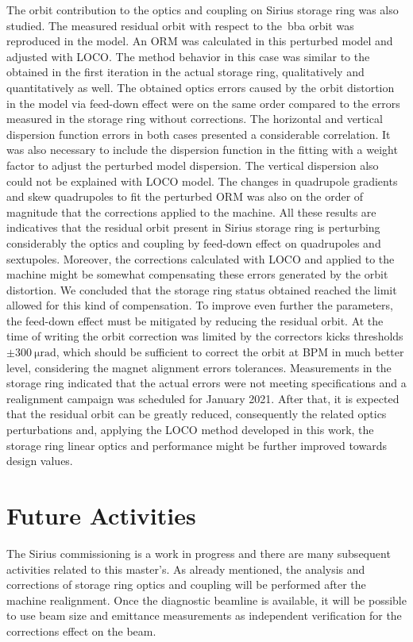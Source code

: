 The orbit contribution to the optics and coupling on Sirius storage ring was also studied. The measured residual orbit with respect to the~\gls{bba} orbit was reproduced in the model. An ORM was calculated in this perturbed model and adjusted with LOCO. The method behavior in this case was similar to the obtained in the first iteration in the actual storage ring, qualitatively and quantitatively as well. The obtained optics errors caused by the orbit distortion in the model via feed-down effect were on the same order compared to the errors measured in the storage ring without corrections. The horizontal and vertical dispersion function errors in both cases presented a considerable correlation. It was also necessary to include the dispersion function in the fitting with a weight factor to adjust the perturbed model dispersion. The vertical dispersion also could not be explained with LOCO model. The changes in quadrupole gradients and skew quadrupoles to fit the perturbed ORM was also on the order of magnitude that the corrections applied to the machine. All these results are indicatives that the residual orbit present in Sirius storage ring is perturbing considerably the optics and coupling by feed-down effect on quadrupoles and sextupoles. Moreover, the corrections calculated with LOCO and applied to the machine might be somewhat compensating these errors generated by the orbit distortion. We concluded that the storage ring status obtained reached the limit allowed for this kind of compensation. To improve even further the parameters, the feed-down effect must be mitigated by reducing the residual orbit. At the time of writing the orbit correction was limited by the correctors kicks thresholds $\pm\SI{300}{\micro\radian}$, which should be sufficient to correct the orbit at BPM in much better level, considering the magnet alignment errors tolerances. Measurements in the storage ring indicated that the actual errors were not meeting specifications and a realignment campaign was scheduled for January 2021. After that, it is expected that the residual orbit can be greatly reduced, consequently the related optics perturbations and, applying the LOCO method developed in this work, the storage ring linear optics and performance might be further improved towards design values. 
\section*{Future Activities}
The Sirius commissioning is a work in progress and there are many subsequent activities related to this master's. As already mentioned, the analysis and corrections of storage ring optics and coupling will be performed after the machine realignment. Once the diagnostic beamline is available, it will be possible to use beam size and emittance measurements as independent verification for the corrections effect on the beam. 

